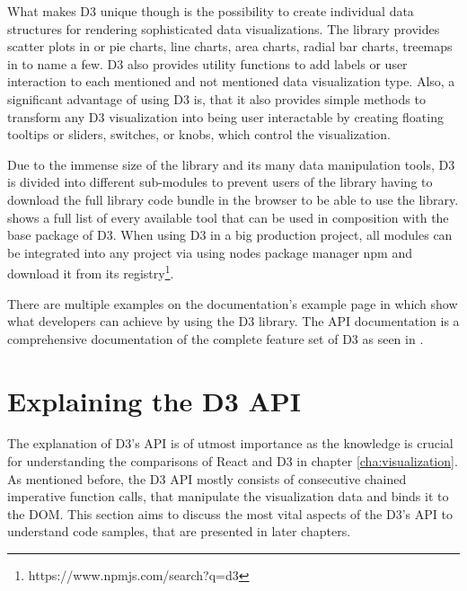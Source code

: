What makes D3 unique though is the possibility to create individual data structures for rendering sophisticated data visualizations. The library provides scatter plots in \cite[/d3-scale]{D3Github} or pie charts, line charts, area charts, radial bar charts, treemaps in \cite[/d3-shape]{D3Github} to name a few. D3 also provides utility functions to add labels or user interaction to each mentioned and not mentioned data visualization type. Also, a significant advantage of using D3 is, that it also provides simple methods to transform any D3 visualization into being user interactable by creating floating tooltips or sliders, switches, or knobs, which control the visualization.

Due to the immense size of the library and its many data manipulation tools, D3 is divided into different sub-modules to prevent users of the library having to download the full library code bundle in the browser to be able to use the library. \cite{D3Github} shows a full list of every available tool that can be used in composition with the base package of D3. When using D3 in a big production project, all modules can be integrated into any project via using nodes package manager npm and download it from its registry\footnote{https://www.npmjs.com/search?q=d3}.

\begin{emergency}{1em}
There are multiple examples on the documentation's example page in \cite{D3Examples} which show what developers can achieve by using the D3 library. The API documentation is a comprehensive documentation of the complete feature set of D3 as seen in \cite[\mbox{/d3/blob/master/API.md}]{D3Github}.
\end{emergency}


\section{Explaining the D3 API} 

The explanation of D3's API is of utmost importance as the knowledge is crucial for understanding the comparisons of React and D3 in chapter \ref{cha:visualization}. As mentioned before, the D3 API mostly consists of consecutive chained imperative function calls, that manipulate the visualization data and binds it to the DOM. This section aims to discuss the most vital aspects of the D3's API to understand code samples, that are presented in later chapters.

